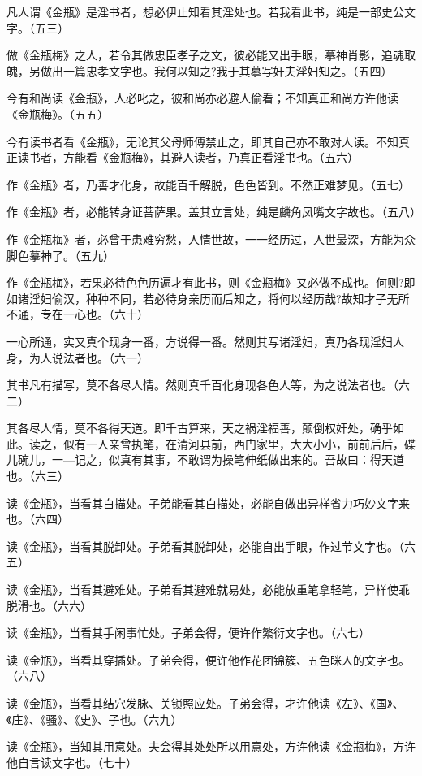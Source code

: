 {凡人谓《金瓶》是淫书者，想必伊止知看其淫处也。若我看此书，纯是一部史公文字。（五三）

做《金瓶梅》之人，若令其做忠臣孝子之文，彼必能又出手眼，摹神肖影，追魂取魄，另做出一篇忠孝文字也。我何以知之?我于其摹写奸夫淫妇知之。（五四）

今有和尚读《金瓶》，人必叱之，彼和尚亦必避人偷看；不知真正和尚方许他读《金瓶梅》。（五五）

今有读书者看《金瓶》，无论其父母师傅禁止之，即其自己亦不敢对人读。不知真正读书者，方能看《金瓶梅》，其避人读者，乃真正看淫书也。（五六）

作《金瓶》者，乃善才化身，故能百千解脱，色色皆到。不然正难梦见。（五七）

作《金瓶》者，必能转身证菩萨果。盖其立言处，纯是麟角凤嘴文字故也。（五八）

作《金瓶梅》者，必曾于患难穷愁，人情世故，一一经历过，人世最深，方能为众脚色摹神了。（五九）

作《金瓶梅》，若果必待色色历遍才有此书，则《金瓶梅》又必做不成也。何则?即如诸淫妇偷汉，种种不同，若必待身亲历而后知之，将何以经历哉?故知才子无所不通，专在一心也。（六十）

一心所通，实又真个现身一番，方说得一番。然则其写诸淫妇，真乃各现淫妇人身，为人说法者也。（六一）

其书凡有描写，莫不各尽人情。然则真千百化身现各色人等，为之说法者也。（六二）

其各尽人情，莫不各得天道。即千古算来，天之祸淫福善，颠倒权奸处，确乎如此。读之，似有一人亲曾执笔，在清河县前，西门家里，大大小小，前前后后，碟儿碗儿，一—记之，似真有其事，不敢谓为操笔伸纸做出来的。吾故曰：得天道也。（六三）

读《金瓶》，当看其白描处。子弟能看其白描处，必能自做出异样省力巧妙文字来也。（六四）

读《金瓶》，当看其脱卸处。子弟看其脱卸处，必能自出手眼，作过节文字也。（六五）

读《金瓶》，当看其避难处。子弟看其避难就易处，必能放重笔拿轻笔，异样使乖脱滑也。（六六）

读《金瓶》，当看其手闲事忙处。子弟会得，便许作繁衍文字也。（六七）

读《金瓶》，当看其穿插处。子弟会得，便许他作花团锦簇、五色眯人的文字也。（六八）

读《金瓶》，当看其结穴发脉、关锁照应处。子弟会得，才许他读《左》、《国》、《庄》、《骚》、《史》、子也。（六九）

读《金瓶》，当知其用意处。夫会得其处处所以用意处，方许他读《金瓶梅》，方许他自言读文字也。（七十）

}
